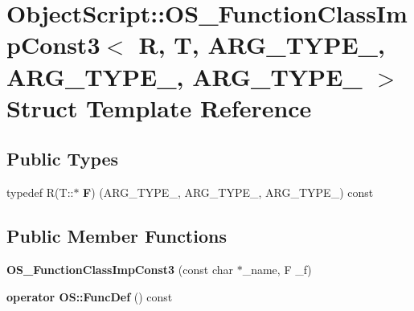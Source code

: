 \hypertarget{struct_object_script_1_1_o_s___function_class_imp_const3}{}\section{Object\+Script\+:\+:O\+S\+\_\+\+Function\+Class\+Imp\+Const3$<$ R, T, A\+R\+G\+\_\+\+T\+Y\+P\+E\+\_, A\+R\+G\+\_\+\+T\+Y\+P\+E\+\_, A\+R\+G\+\_\+\+T\+Y\+P\+E\+\_ $>$ Struct Template Reference}
\label{struct_object_script_1_1_o_s___function_class_imp_const3}
\subsection*{Public Types}
\begin{DoxyCompactItemize}
\item 
typedef R(T\+::$\ast$ {\bfseries F}) (A\+R\+G\+\_\+\+T\+Y\+P\+E\+\_, A\+R\+G\+\_\+\+T\+Y\+P\+E\+\_, A\+R\+G\+\_\+\+T\+Y\+P\+E\+\_) const \hypertarget{struct_object_script_1_1_o_s___function_class_imp_const3_a72481351c5cedc221b99c33033940e7b}{}\label{struct_object_script_1_1_o_s___function_class_imp_const3_a72481351c5cedc221b99c33033940e7b}

\end{DoxyCompactItemize}
\subsection*{Public Member Functions}
\begin{DoxyCompactItemize}
\item 
{\bfseries O\+S\+\_\+\+Function\+Class\+Imp\+Const3} (const char $\ast$\+\_\+name, F \+\_\+f)\hypertarget{struct_object_script_1_1_o_s___function_class_imp_const3_aa353a98001e758d5af6396ba814cff85}{}\label{struct_object_script_1_1_o_s___function_class_imp_const3_aa353a98001e758d5af6396ba814cff85}

\item 
{\bfseries operator O\+S\+::\+Func\+Def} () const \hypertarget{struct_object_script_1_1_o_s___function_class_imp_const3_a5966f215a2e35a16f216da832e6fef8a}{}\label{struct_object_script_1_1_o_s___function_class_imp_const3_a5966f215a2e35a16f216da832e6fef8a}

\end{DoxyCompactItemize}
